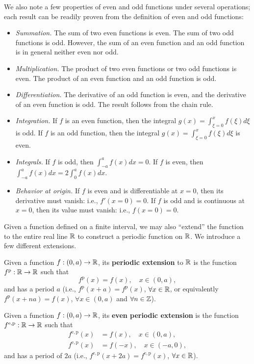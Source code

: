 We also note a few properties of even and odd functions under several operations; each result can be readily proven from the definition of even and odd functions:
\begin{itemize}
    \item \textit{Summation.} The sum of two even functions is even. The sum of two odd functions is odd. However, the sum of an even function and an odd function is in general neither even nor odd.
    \item \textit{Multiplication.} The product of two even functions or two odd functions is even. The product of an even function and an odd function is odd.
    \item \textit{Differentiation.} The derivative of an odd function is even, and the derivative of an even function is odd. The result follows from the chain rule.
    \item \textit{Integration.} If $f$ is an even function, then the integral $g(x) = \int_{\xi=0}^{x} f(\xi) d\xi$ is odd. If $f$ is an odd function, then the integral $g(x) = \int_{\xi=0}^{x} f(\xi) d\xi$ is even.
    \item \textit{Integrals.} If $f$ is odd, then $\int_{-a}^{a} f(x) dx = 0$. If $f$ is even, then $\int_{-a}^{a} f(x) dx = 2 \int_0^a f(x) dx$.
    \item \textit{Behavior at origin.} If $f$ is even and is differentiable at $x = 0$, then its derivative must vanish: i.e., $f'(x = 0) = 0$. If $f$ is odd and is continuous at $x = 0$, then its value must vanish: i.e., $f(x = 0) = 0$.
\end{itemize}

Given a function defined on a finite interval, we may also ``extend'' the function to the entire real line $\mathbb{R}$ to construct a periodic function on $\mathbb{R}$. We introduce a few different extensions.

\begin{definition}
    Given a function $f : (0, a) \to \mathbb{R}$, its \textbf{periodic extension} to $\mathbb{R}$ is the function $f^{\mathrm{p}} : \mathbb{R} \to \mathbb{R}$ such that
    \[f^{\mathrm{p}}(x) = f(x), \quad x \in (0, a),\]
    and has a period $a$ (i.e., $f^{\mathrm{p}}(x + a) = f^{\mathrm{p}}(x)$, $\forall x \in \mathbb{R}$, or equivalently $f^{\mathrm{p}}(x + na) = f(x)$, $\forall x \in (0, a)$ and $\forall n \in \mathbb{Z}$).
\end{definition}

\begin{definition}
    Given a function $f : (0, a) \to \mathbb{R}$, its \textbf{even periodic extension} is the function $f^{\mathrm{e,p}} : \mathbb{R} \to \mathbb{R}$ such that
    \begin{align*}
        f^{\mathrm{e,p}}(x) &= f(x), \quad x \in (0, a), \\
        f^{\mathrm{e,p}}(x) &= f(-x), \quad x \in (-a, 0),
    \end{align*}
    and has a period of $2a$ (i.e., $f^{\mathrm{e,p}}(x + 2a) = f^{\mathrm{e,p}}(x)$, $\forall x \in \mathbb{R}$).
\end{definition}


